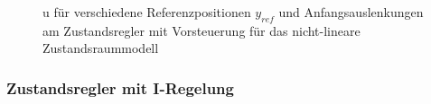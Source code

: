 \begin{figure}[H]
    \centering
    \caption[u für Regler mit Vorsteuerung (nicht-linear)]{u für verschiedene Referenzpositionen $y_{ref}$ und Anfangsauslenkungen am Zustandsregler mit Vorsteuerung für das nicht-lineare Zustandsraummodell}
    \label{fig:Bild35}
\end{figure}

\subsubsection{Zustandsregler mit I-Regelung}


